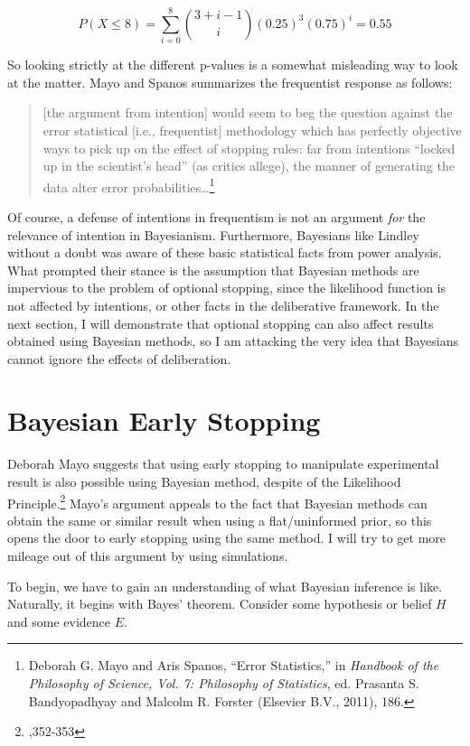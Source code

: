 \[P(X \leq 8) =  \sum_{i=0}^{8} {3+i-1 \choose i} (0.25)^3 (0.75)^{i} =0.55\]

So looking strictly at the different p-values is a somewhat misleading
way to look at the matter. Mayo and Spanos summarizes the frequentist
response as follows:

\begin{quote}
{[}the argument from intention{]} would seem to beg the question against
the error statistical {[}i.e., frequentist{]} methodology which has
perfectly objective ways to pick up on the effect of stopping rules: far
from intentions ``locked up in the scientist's head'' (as critics
allege), the manner of generating the data alter error
probabilities\ldots{}\footnote{Deborah G. Mayo and Aris Spanos, ``Error
  Statistics,'' in \emph{Handbook of the Philosophy of Science, Vol. 7:
  Philosophy of Statistics}, ed. Prasanta S. Bandyopadhyay and Malcolm
  R. Forster (Elsevier B.V., 2011), 186.}
\end{quote}

Of course, a defense of intentions in frequentism is not an argument
\emph{for} the relevance of intention in Bayesianism. Furthermore,
Bayesians like Lindley without a doubt was aware of these basic
statistical facts from power analysis. What prompted their stance is the
assumption that Bayesian methods are impervious to the problem of
optional stopping, since the likelihood function is not affected by
intentions, or other facts in the deliberative framework. In the next
section, I will demonstrate that optional stopping can also affect
results obtained using Bayesian methods, so I am attacking the very idea
that Bayesians cannot ignore the effects of deliberation.

\hypertarget{bayesian-early-stopping}{%
\section{Bayesian Early
Stopping}\label{ch: bayesian-early-stopping}}

Deborah Mayo suggests that using early stopping to manipulate experimental result is also possible using Bayesian method, despite of the Likelihood Principle.\footnote{\cite{errorgrowth},352-353} Mayo's argument appeals to the fact that Bayesian methods can obtain the same or similar result when using a flat/uninformed prior, so this opens the door to early stopping using the same method. I will try to get more mileage out of this argument by using simulations.

To begin, we have to gain an understanding of what Bayesian inference is
like. Naturally, it begins with Bayes' theorem. Consider some hypothesis
or belief \(H\) and some evidence \(E\).

